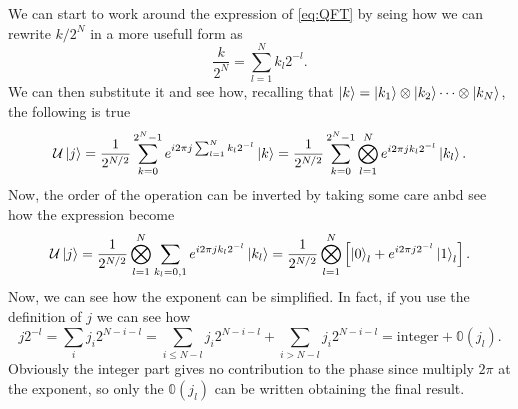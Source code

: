 {
    We can start to work around the expression of \eqref{eq:QFT} by seing how we can rewrite $k/2^{N}$ in a more usefull form as
    \begin{equation}
        \frac{k}{2^N} = \sum_{l=1}^N k_l 2^{-l}.
    \end{equation}
    We can then substitute it and see how, recalling that $\ket{k} = \ket{k_1}\otimes\ket{k_2}\dots\otimes\ket{k_N}$, the following is true
    \begin{equation}
        \mathcal{U}\ket{j} = \frac{1}{2^{N/2}} \sum_{k=0}^{2^N-1} e^{i2\pi j\sum_{l=1}^N k_l 2^{-l}} \ket{k} = \frac{1}{2^{N/2}}\sum_{k=0}^{2^N - 1}\bigotimes_{l=1}^N e^{i2\pi jk_l 2^{-l}}\ket{k_l}.
    \end{equation}
    Now, the order of the operation can be inverted by taking some care anbd see how the expression become
    \begin{equation}
        \mathcal{U}\ket{j} = \frac{1}{2^{N/2}}\bigotimes_{l=1}^N \sum_{k_l = 0, 1}e^{i2\pi jk_l 2^{-l}}\ket{k_l} = \frac{1}{2^{N/2}}\bigotimes_{l=1}^N\left[ \ket{0}_l + e^{i2\pi j2^{-l}}\ket{1}_l \right].
    \end{equation}
    Now, we can see how the exponent can be simplified. In fact, if you use the definition of $j$ we can see how
    \begin{equation}
        j2^{-l} = \sum_i j_i 2^{N - i - l} = \sum_{i \le N-l} j_i 2^{N - i - l} + \sum_{i > N-l} j_i 2^{N - i - l} = \text{integer} + \mathbb{0}(j_l).
    \end{equation}
    Obviously the integer part gives no contribution to the phase since multiply $2\pi$ at the exponent, so only the $\mathbb{0}(j_l)$ can be written obtaining the final result.
}

